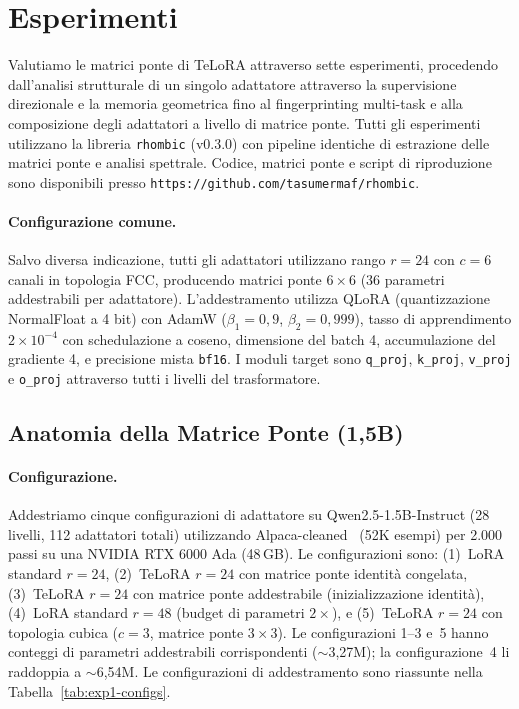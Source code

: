 \documentclass[11pt]{article}
\begin{document}

\section{Esperimenti}
\label{sec:experiments}

Valutiamo le matrici ponte di TeLoRA attraverso sette esperimenti,
procedendo dall'analisi strutturale di un singolo adattatore attraverso
la supervisione direzionale e la memoria geometrica fino al
fingerprinting multi-task e alla composizione degli adattatori a livello
di matrice ponte. Tutti gli esperimenti utilizzano la libreria
\texttt{rhombic} (v0.3.0) con pipeline identiche di estrazione delle
matrici ponte e analisi spettrale. Codice, matrici ponte e script di
riproduzione sono disponibili presso
\texttt{https://github.com/tasumermaf/rhombic}.

\paragraph{Configurazione comune.}
Salvo diversa indicazione, tutti gli adattatori utilizzano rango
$r = 24$ con $c = 6$ canali in topologia FCC, producendo matrici ponte
$6 \times 6$ (36 parametri addestrabili per adattatore).
L'addestramento utilizza QLoRA (quantizzazione NormalFloat a 4 bit) con
AdamW ($\beta_1 = 0{,}9$, $\beta_2 = 0{,}999$), tasso di apprendimento
$2 \times 10^{-4}$ con schedulazione a coseno, dimensione del batch 4,
accumulazione del gradiente 4, e precisione mista \texttt{bf16}. I
moduli target sono \texttt{q\_proj}, \texttt{k\_proj}, \texttt{v\_proj}
e \texttt{o\_proj} attraverso tutti i livelli del trasformatore.

\subsection{Anatomia della Matrice Ponte (1,5B)}
\label{sec:exp-anatomy-1b}

\paragraph{Configurazione.} Addestriamo cinque configurazioni di
adattatore su Qwen2.5-1.5B-Instruct (28 livelli, 112 adattatori
totali) utilizzando Alpaca-cleaned~\cite{alpaca} (52K esempi) per 2.000
passi su una NVIDIA RTX 6000 Ada (48\,GB). Le configurazioni sono:
(1)~LoRA standard $r\!=\!24$, (2)~TeLoRA $r\!=\!24$ con matrice
ponte identit\`a congelata, (3)~TeLoRA $r\!=\!24$ con matrice ponte
addestrabile (inizializzazione identit\`a), (4)~LoRA standard
$r\!=\!48$ (budget di parametri $2\times$), e (5)~TeLoRA
$r\!=\!24$ con topologia cubica ($c\!=\!3$, matrice ponte $3 \times 3$).
Le configurazioni 1--3 e~5 hanno conteggi di parametri addestrabili
corrispondenti ($\sim$3,27M); la configurazione~4 li raddoppia a
$\sim$6,54M. Le configurazioni di addestramento sono riassunte nella
Tabella~\ref{tab:exp1-configs}.
\end{document}
